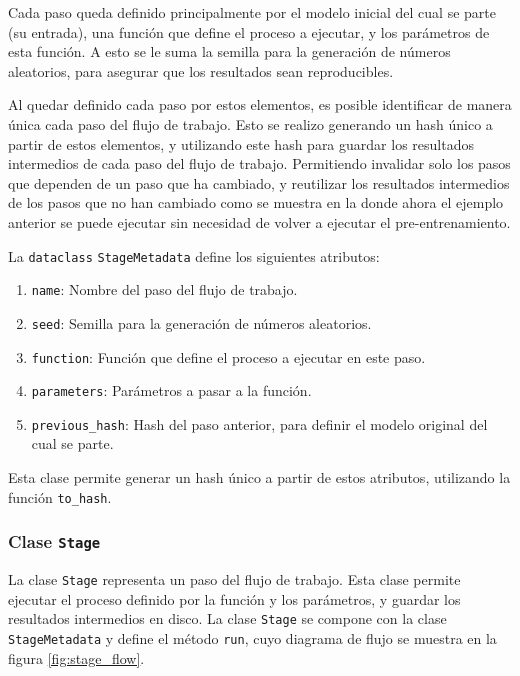 Cada paso queda definido principalmente por el modelo inicial del cual se parte (su entrada), una función que define el proceso a ejecutar, y los parámetros de esta función. A esto se le suma la semilla para la generación de números aleatorios, para asegurar que los resultados sean reproducibles.

Al quedar definido cada paso por estos elementos, es posible identificar de manera única cada paso del flujo de trabajo. Esto se realizo generando un hash único a partir de estos elementos, y utilizando este hash para guardar los resultados intermedios de cada paso del flujo de trabajo. Permitiendo invalidar solo los pasos que dependen de un paso que ha cambiado, y reutilizar los resultados intermedios de los pasos que no han cambiado como se muestra en la  donde ahora el ejemplo anterior se puede ejecutar sin necesidad de volver a ejecutar el pre-entrenamiento.


La \texttt{dataclass} \texttt{StageMetadata} define los siguientes atributos:

\begin{enumerate}
    \item \texttt{name}: Nombre del paso del flujo de trabajo.
    \item \texttt{seed}: Semilla para la generación de números aleatorios.
    \item \texttt{function}: Función que define el proceso a ejecutar en este paso.
    \item \texttt{parameters}: Parámetros a pasar a la función.
    \item \texttt{previous\_hash}: Hash del paso anterior, para definir el modelo original del cual se parte.
\end{enumerate}

Esta clase permite generar un hash único a partir de estos atributos, utilizando la función \texttt{to\_hash}.

\subsubsection{Clase \texttt{Stage}}

La clase \texttt{Stage} representa un paso del flujo de trabajo. Esta clase permite ejecutar el proceso definido por la función y los parámetros, y guardar los resultados intermedios en disco. La clase \texttt{Stage} se compone con la clase \texttt{StageMetadata} y define el método \texttt{run}, cuyo diagrama de flujo se muestra en la figura \ref{fig:stage_flow}.

